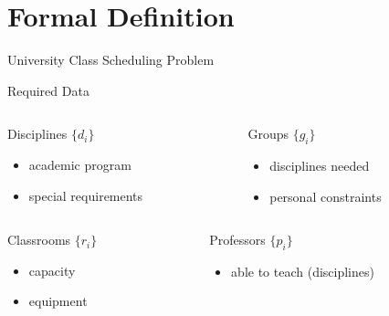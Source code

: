 \section{Formal Definition}

\begin{frame}{University Class Scheduling Problem}
  \centering
  \begin{block}{Required Data}
    \begin{columns}[t]
      \begin{column}{.4\textwidth}
        \begin{block}{Disciplines $\{d_i\}$}
          \begin{itemize}
            \item academic program
            \item special requirements
          \end{itemize}
        \end{block}
      \end{column}
      \begin{column}{.4\textwidth}
        \begin{block}{Groups $\{g_i\}$}
          \begin{itemize}
            \item disciplines needed
            \item personal constraints
          \end{itemize}
        \end{block}
      \end{column}
    \end{columns}
    \begin{columns}[t]
      \begin{column}{.4\textwidth}
        \begin{block}{Classrooms $\{r_i\}$}
          \begin{itemize}
            \item capacity
            \item equipment
          \end{itemize}
        \end{block}
      \end{column}
      \begin{column}{.4\textwidth}
        \begin{block}{Professors $\{p_i\}$}
          \begin{itemize}
            \item able to teach (disciplines)

\end{itemize}
\end{block}
\end{column}
\end{columns}
\end{block}
\end{frame}

